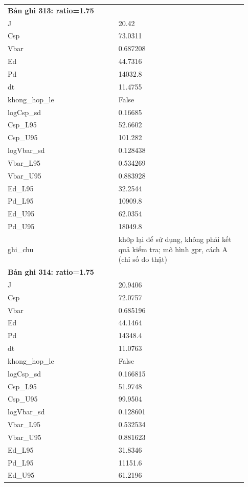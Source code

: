 \begin{longtable}{p{0.43\linewidth}p{0.50\linewidth}}
\midrule
\multicolumn{2}{p{0.95\linewidth}}{\textbf{Bản ghi 313: ratio=1.75}} \\
J & 20.42 \\
Csp & 73.0311 \\
Vbar & 0.687208 \\
Ed & 44.7316 \\
Pd & 14032.8 \\
dt & 11.4755 \\
khong\_\allowbreak hop\_\allowbreak le & False \\
logCsp\_\allowbreak sd & 0.16685 \\
Csp\_\allowbreak L95 & 52.6602 \\
Csp\_\allowbreak U95 & 101.282 \\
logVbar\_\allowbreak sd & 0.128438 \\
Vbar\_\allowbreak L95 & 0.534269 \\
Vbar\_\allowbreak U95 & 0.883928 \\
Ed\_\allowbreak L95 & 32.2544 \\
Pd\_\allowbreak L95 & 10909.8 \\
Ed\_\allowbreak U95 & 62.0354 \\
Pd\_\allowbreak U95 & 18049.8 \\
ghi\_\allowbreak chu & khớp lại để sử dụng, không phải kết quả kiểm tra; mô hình gpr, cách A (chỉ số đo thật) \\
\midrule
\multicolumn{2}{p{0.95\linewidth}}{\textbf{Bản ghi 314: ratio=1.75}} \\
J & 20.9406 \\
Csp & 72.0757 \\
Vbar & 0.685196 \\
Ed & 44.1464 \\
Pd & 14348.4 \\
dt & 11.0763 \\
khong\_\allowbreak hop\_\allowbreak le & False \\
logCsp\_\allowbreak sd & 0.166815 \\
Csp\_\allowbreak L95 & 51.9748 \\
Csp\_\allowbreak U95 & 99.9504 \\
logVbar\_\allowbreak sd & 0.128601 \\
Vbar\_\allowbreak L95 & 0.532534 \\
Vbar\_\allowbreak U95 & 0.881623 \\
Ed\_\allowbreak L95 & 31.8346 \\
Pd\_\allowbreak L95 & 11151.6 \\
Ed\_\allowbreak U95 & 61.2196 \\

\end{longtable}
